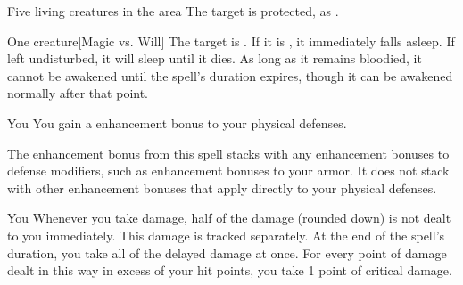 \spelldur{\durshort}
\begin{spelltarget}{Five living creatures in the area}
    \spelleffect The target is protected, as .
\end{spelltarget}

\spellrng{\rngmed}
\spelldur{\durlong}
\begin{spelltarget}{One creature}[Magic vs. Will]
    \spellsuccess The target is \bewildered. If it is \bloodied, it immediately falls asleep. If left undisturbed, it will sleep until it dies. As long as it remains bloodied, it cannot be awakened until the spell's duration expires, though it can be awakened normally after that point.
\end{spelltarget}

\spelldur{\durlong}
\begin{spelltarget}{You}
    \spelleffect You gain a  enhancement bonus to your physical defenses. \spellbonusscalingdescription
\end{spelltarget}
\spellnotes The enhancement bonus from this spell stacks with any enhancement bonuses to defense modifiers, such as enhancement bonuses to your armor. It does not stack with other enhancement bonuses that apply directly to your physical defenses. 

\spelldur{\durmed}
\begin{spelltarget}{You}
    \spelleffect Whenever you take damage, half of the damage (rounded down) is not dealt to you immediately. This damage is tracked separately. At the end of the spell's duration, you take all of the delayed damage at once. For every point of damage dealt in this way in excess of your hit points, you take 1 point of critical damage.
\end{spelltarget}

